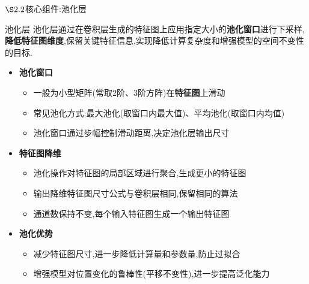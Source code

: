 \documentclass{beamer}
\begin{document}
\begin{frame}{$\S2.2$核心组件:池化层}
  \begin{block}{池化层}
    池化层通过在卷积层生成的特征图上应用指定大小的\textbf{池化窗口}进行下采样,\textbf{降低特征图维度},保留关键特征信息,实现降低计算复杂度和增强模型的空间不变性的目标.
  \end{block}
  \begin{itemize}
    \item \textbf{池化窗口}
      \begin{itemize}
        \item 一般为小型矩阵(常取2阶、3阶方阵)在\textbf{特征图}上滑动
        \item 常见池化方式:最大池化(取窗口内最大值)、平均池化(取窗口内均值)
        \item 池化窗口通过步幅控制滑动距离,决定池化层输出尺寸
      \end{itemize}
    \item \textbf{特征图降维}
      \begin{itemize}
        \item 池化操作对特征图的局部区域进行聚合,生成更小的特征图
        \item 输出降维特征图尺寸公式与卷积层相同,保留相同的算法
        \item 通道数保持不变,每个输入特征图生成一个输出特征图
      \end{itemize}
    \item \textbf{池化优势}
      \begin{itemize}
        \item 减少特征图尺寸,进一步降低计算量和参数量,防止过拟合
        \item 增强模型对位置变化的鲁棒性(平移不变性),进一步提高泛化能力
      \end{itemize}
  \end{itemize}
\end{frame}
\end{document}

